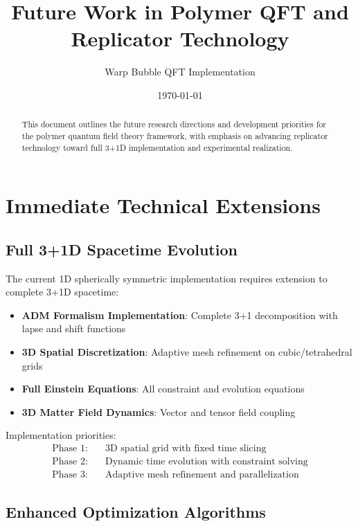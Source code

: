 \documentclass[11pt]{article}
\title{Future Work in Polymer QFT and Replicator Technology}
\author{Warp Bubble QFT Implementation}
\date{\today}
\begin{document}
\maketitle

\begin{abstract}
This document outlines the future research directions and development priorities for the polymer quantum field theory framework, with emphasis on advancing replicator technology toward full 3+1D implementation and experimental realization.
\end{abstract}

\section{Immediate Technical Extensions}

\subsection{Full 3+1D Spacetime Evolution}

The current 1D spherically symmetric implementation requires extension to complete 3+1D spacetime:

\begin{itemize}
\item \textbf{ADM Formalism Implementation}: Complete 3+1 decomposition with lapse and shift functions
\item \textbf{3D Spatial Discretization}: Adaptive mesh refinement on cubic/tetrahedral grids
\item \textbf{Full Einstein Equations}: All constraint and evolution equations
\item \textbf{3D Matter Field Dynamics}: Vector and tensor field coupling
\end{itemize}

Implementation priorities:
\begin{align}
\text{Phase 1:} &\quad \text{3D spatial grid with fixed time slicing} \\
\text{Phase 2:} &\quad \text{Dynamic time evolution with constraint solving} \\
\text{Phase 3:} &\quad \text{Adaptive mesh refinement and parallelization}
\end{align}

\subsection{Enhanced Optimization Algorithms}
\end{document}
